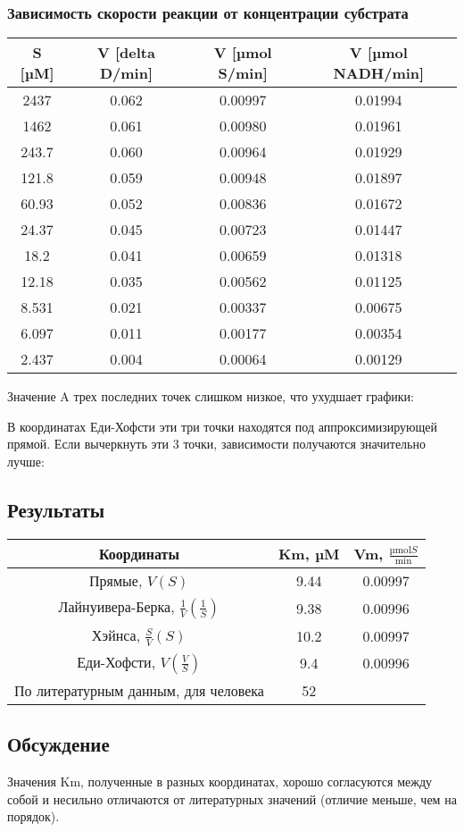 \subsubsection{Зависимость скорости реакции от концентрации субстрата}
\begin{tabular}{|c|c|c|c|}
\hline
S [µM] &
V [delta D/min] &
V [µmol S/min] &
V [µmol NADH/min] \\
\hline
2437  & 0.062 &  0.00997 & 0.01994 \\
1462  & 0.061 &  0.00980 & 0.01961 \\
243.7 & 0.060 &  0.00964 & 0.01929 \\
121.8 & 0.059 &  0.00948 & 0.01897 \\
60.93 & 0.052 &  0.00836 & 0.01672 \\
24.37 & 0.045 &  0.00723 & 0.01447 \\
18.2  & 0.041 &  0.00659 & 0.01318 \\
12.18 & 0.035 &  0.00562 & 0.01125 \\
8.531 & 0.021 &  0.00337 & 0.00675 \\
6.097 & 0.011 &  0.00177 & 0.00354 \\
2.437 & 0.004 &  0.00064 & 0.00129 \\
\hline
\end{tabular}

Значение A трех последних точек слишком низкое,
что ухудшает графики:





В координатах Еди-Хофсти эти три точки находятся под аппроксимизирующей прямой.
Если вычеркнуть эти 3 точки, зависимости получаются значительно лучше:









\subsection{Результаты}

\begin{tabular}{|c|c|c|}
\hline
Координаты & Km, µM & Vm, $\frac{\text{µmol} S}{\text{min}}$ \\
\hline
Прямые,           $V(S)$                       & 9.44 & 0.00997 \\
Лайнуивера-Берка, $\frac{1}{V}(\frac{1}{S})$   & 9.38 & 0.00996 \\
Хэйнса,           $\frac{S}{V}(S)$             & 10.2 & 0.00997 \\
Еди-Хофсти,       $V(\frac{V}{S})$             & 9.4  & 0.00996 \\
\hline
По литературным данным, для человека \cite{uniprot-human}
                                               & 52 & \\
\hline
\end{tabular}

\subsection{Обсуждение}
Значения Km, полученные в разных координатах, хорошо согласуются между собой
и несильно отличаются от литературных значений (отличие меньше, чем на порядок).


